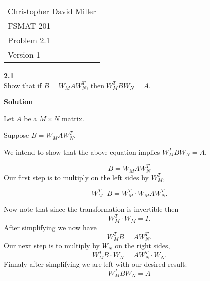 \documentclass[12pt]{article}
\begin{document}
\begin{flushright}
\begin{tabular}{l}
Christopher David Miller \\  %
FSMAT 201 \\  %
Problem 2.1 \\  %
Version 1 \\ %
\end{tabular}
\end{flushright}
\vspace{20pt}  %


\textbf{2.1} \\  %
Show that if $B = W_MAW_{N}^{T}$, then $W_{M}^{T}BW_N = A$.

\textbf{Solution}

Let $A$ be a $M \times N$ matrix.

Suppose $B = W_MAW_{N}^{T}$.

We intend to show that the above equation implies $W_{M}^{T}BW_N = A$.

  $$B = W_MAW_{N}^{T}$$
  Our first step is to multiply on the left sides by $W_{M}^{T},$ 

  $$W_{M}^{T} \cdot B = W_{M}^{T} \cdot W_MAW_{N}^{T}.$$

  Now note that since the transformation is invertible then $$W_{M}^{T} \cdot W_M = I.$$
  After simplifying we now have
  $$W_{M}^{T} B = AW_{N}^{T}.$$
  Our next step is to multiply by $W_{N}$ on the right sides, $$W_{M}^{T} B \cdot W_{N} = AW_{N}^{T} \cdot W_{N}.$$
  Finnaly after simplifying we are left with our desired result:
  $$W_{M}^{T}BW_N = A$$
\end{document}
